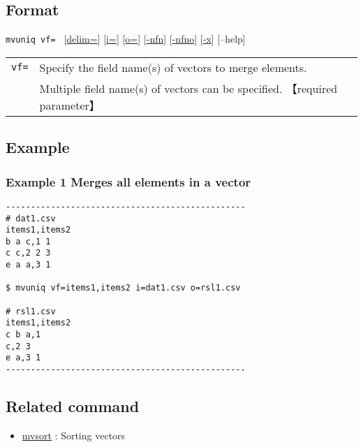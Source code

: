 \documentclass[a4paper]{jarticle}
\begin{document}
\subsection*{Format}
\verb|mvuniq vf= |
[\href{run:delim.pdf}{delim=}]
[\href{run:input.pdf}{i=}]
[\href{run:output.pdf}{o=}]
[\href{run:nfn.pdf}{-nfn}]
[\href{run:nfno.pdf}{-nfno}]
[\href{run:x.pdf}{-x}] [--help]

\begin{table}[htbp]
{\small
\begin{tabular}{ll}
\verb|vf=| & Specify the field name(s) of vectors to merge elements. \\
& Multiple field name(s) of vectors can be specified. 【required parameter】 \\
\end{tabular}
}
\end{table} 

\subsection*{Example}
\subsubsection*{Example 1 Merges all elements in a vector}
\begin{verbatim}
------------------------------------------------
# dat1.csv
items1,items2
b a c,1 1
c c,2 2 3
e a a,3 1

$ mvuniq vf=items1,items2 i=dat1.csv o=rsl1.csv

# rsl1.csv
items1,items2
c b a,1
c,2 3
e a,3 1
------------------------------------------------
\end{verbatim}


\subsection*{Related command}
\begin{itemize}
\item \href{run:mvsort.pdf}{mvsort} : Sorting vectors 
\end{itemize}
\end{document}
